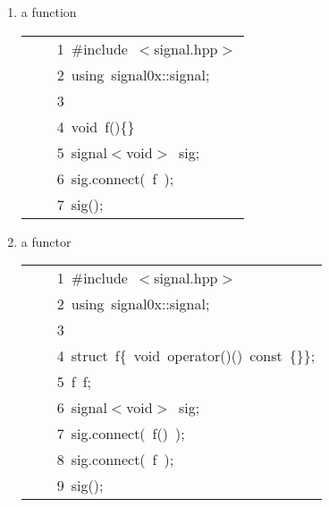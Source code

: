 \documentclass[9pt,onside,a4paper]{article}
\newcommand{\hlstd}[1]{\textcolor[rgb]{0.2,0,0.4}{#1}}
\newcommand{\hlppc}[1]{\textcolor[rgb]{0.33,0.45,0.69}{#1}}
\newcommand{\hlopt}[1]{\textcolor[rgb]{0.33,0.33,0.33}{#1}}
\newcommand{\hllin}[1]{\textcolor[rgb]{0.6,0.6,0.6}{#1}}
\newcommand{\hlkwa}[1]{\textcolor[rgb]{1,0.19,0.19}{#1}}
\newcommand{\hlkwb}[1]{\textcolor[rgb]{0.96,0.55,0.14}{#1}}
\newcommand{\hlkwc}[1]{\textcolor[rgb]{0,0,1}{#1}}
\newcommand{\hlkwd}[1]{\textcolor[rgb]{0.82,0.11,0.93}{#1}}
\begin{document}
\begin{enumerate}

\item a function \\

\ttfamily
\begin{center}
\begin{xtabular}{||l||}
\hline
\hlstd{}\hllin{\ \ \ \ 1\ }\hlppc{\#include\ $<$signal.hpp$>$}\\
\hllin{\ \ \ \ 2\ }\hlstd{}\hlkwa{using\ }\hlstd{signal0x}\hlopt{::}\hlstd{signal}\hlopt{;}\\
\hllin{\ \ \ \ 3\ }\hlstd{}\\
\hllin{\ \ \ \ 4\ }\hlkwb{void\ }\hlstd{}\hlkwd{f}\hlstd{}\hlopt{()\{\}}\\
\hllin{\ \ \ \ 5\ }\hlstd{signal}\hlopt{$<$}\hlstd{}\hlkwb{void}\hlstd{}\hlopt{$>$\ }\hlstd{sig}\hlopt{;}\\
\hllin{\ \ \ \ 6\ }\hlstd{sig}\hlopt{.}\hlstd{}\hlkwd{connect}\hlstd{}\hlopt{(\ }\hlstd{f\ }\hlopt{);}\\
\hllin{\ \ \ \ 7\ }\hlstd{}\hlkwd{sig}\hlstd{}\hlopt{();}\hlstd{}\\
\hline
\end{xtabular}
\end{center}
\normalfont
\normalsize

\item a functor \\

\ttfamily
\begin{center}
\begin{xtabular}{||l||}
\hline
\hlstd{}\hllin{\ \ \ \ 1\ }\hlppc{\#include\ $<$signal.hpp$>$}\\
\hllin{\ \ \ \ 2\ }\hlstd{}\hlkwa{using\ }\hlstd{signal0x}\hlopt{::}\hlstd{signal}\hlopt{;}\\
\hllin{\ \ \ \ 3\ }\hlstd{}\\
\hllin{\ \ \ \ 4\ }\hlkwb{struct\ }\hlstd{f}\hlopt{\{\ }\hlstd{}\hlkwb{void\ }\hlstd{}\hlkwc{operator}\hlstd{}\hlopt{()()\ }\hlstd{}\hlkwb{const\ }\hlstd{}\hlopt{\{\}\};}\\
\hllin{\ \ \ \ 5\ }\hlstd{f\ f\textunderscore }\hlopt{;}\\
\hllin{\ \ \ \ 6\ }\hlstd{signal}\hlopt{$<$}\hlstd{}\hlkwb{void}\hlstd{}\hlopt{$>$\ }\hlstd{sig}\hlopt{;}\\
\hllin{\ \ \ \ 7\ }\hlstd{sig}\hlopt{.}\hlstd{}\hlkwd{connect}\hlstd{}\hlopt{(\ }\hlstd{}\hlkwd{f}\hlstd{}\hlopt{()\ );}\\
\hllin{\ \ \ \ 8\ }\hlstd{sig}\hlopt{.}\hlstd{}\hlkwd{connect}\hlstd{}\hlopt{(\ }\hlstd{f\textunderscore \ }\hlopt{);}\\
\hllin{\ \ \ \ 9\ }\hlstd{}\hlkwd{sig}\hlstd{}\hlopt{();}\hlstd{}\\
\hline
\end{xtabular}
\end{center}
\normalfont
\normalsize



\end{enumerate}
\end{document}
